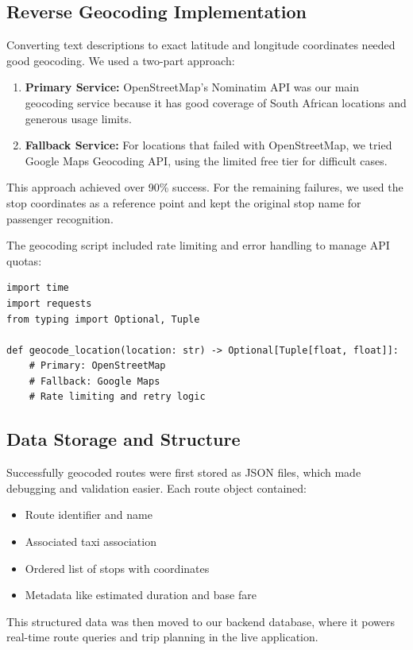 \documentclass[a4paper,12pt]{article}
\begin{document}
\subsection{Reverse Geocoding Implementation}
Converting text descriptions to exact latitude and longitude coordinates needed good geocoding. We used a two-part approach:

\begin{enumerate}
\item \textbf{Primary Service:} OpenStreetMap's Nominatim API was our main geocoding service because it has good coverage of South African locations and generous usage limits.
\item \textbf{Fallback Service:} For locations that failed with OpenStreetMap, we tried Google Maps Geocoding API, using the limited free tier for difficult cases.
\end{enumerate}

This approach achieved over 90\% success. For the remaining failures, we used the stop coordinates as a reference point and kept the original stop name for passenger recognition.

The geocoding script included rate limiting and error handling to manage API quotas:

\begin{verbatim}
import time
import requests
from typing import Optional, Tuple

def geocode_location(location: str) -> Optional[Tuple[float, float]]:
    # Primary: OpenStreetMap
    # Fallback: Google Maps
    # Rate limiting and retry logic
\end{verbatim}

\subsection{Data Storage and Structure}
Successfully geocoded routes were first stored as JSON files, which made debugging and validation easier. Each route object contained:
\begin{itemize}
\item Route identifier and name
\item Associated taxi association
\item Ordered list of stops with coordinates
\item Metadata like estimated duration and base fare
\end{itemize}

This structured data was then moved to our backend database, where it powers real-time route queries and trip planning in the live application.
\end{document}
